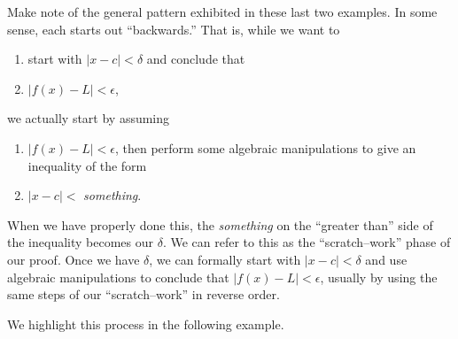 Make note of the general pattern exhibited in these last two examples. In some sense, each starts out ``backwards.'' That is, while we want to
\begin{enumerate}
	\item start with $|x-c|<\delta$ and conclude that
	\item $|f(x)-L|<\epsilon$,
\end{enumerate}
we actually start by assuming 
\begin{enumerate}
	\item $|f(x)-L|<\epsilon$, then perform some algebraic manipulations to give an inequality of the form
	\item $|x-c|<$ \textit{something}.
\end{enumerate} 
When we have properly done this, the \textit{something} on the ``greater than'' side of the inequality becomes our $\delta$. We can refer to this as the ``scratch--work'' phase of our proof. Once we have $\delta$, we can formally start with $|x-c|<\delta$ and use algebraic manipulations to conclude that $|f(x)-L|<\epsilon$, usually by using the same steps of our ``scratch--work'' in reverse order.

We highlight this process in the following example.\\

